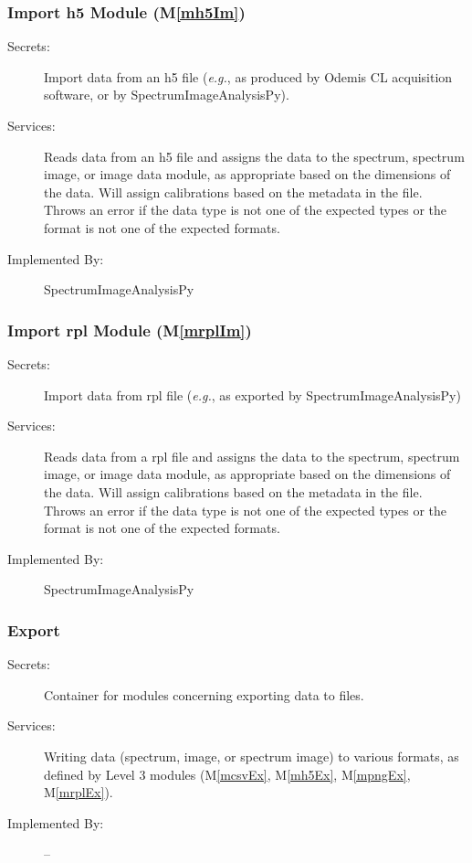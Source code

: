 \documentclass[12pt, titlepage]{article}
\newcommand{\mref}[1]{M\ref{#1}}
\newcommand{\progname}{SpectrumImageAnalysisPy}
\begin{document}
\subsubsection{Import h5 Module (\mref{mh5Im})}
\begin{description}
	\item[Secrets:]Import data from an h5 file (\textit{e.g.}, as produced by
Odemis CL acquisition software, or by \progname).
	\item[Services:]Reads data from an h5 file and assigns the data to the
spectrum, spectrum image, or image data module, as appropriate based on the
dimensions of the data. Will assign calibrations based on the metadata in the
file. Throws an error if the data type is not one of the expected types or the
format is not one of the expected formats.
	\item[Implemented By:] \progname
\end{description}

\subsubsection{Import rpl Module (\mref{mrplIm})}
\begin{description}
	\item[Secrets:]Import data from rpl file (\textit{e.g.}, as exported by
\progname)
	\item[Services:]Reads data from a rpl file and assigns the data to the
spectrum, spectrum image, or image data module, as appropriate based on the
dimensions of the data. Will assign calibrations based on the metadata in the
file. Throws an error if the data type is not one of the expected types or the
format is not one of the expected formats.
	\item[Implemented By:] \progname
\end{description}

\subsubsection{Export}
\begin{description}
	\item[Secrets:]Container for modules concerning exporting data to files.
	\item[Services:]Writing data (spectrum, image, or spectrum image) to various
formats, as defined by Level 3 modules (\mref{mcsvEx}, \mref{mh5Ex},
\mref{mpngEx}, \mref{mrplEx}).
	\item[Implemented By:] --
\end{description}
\end{document}
